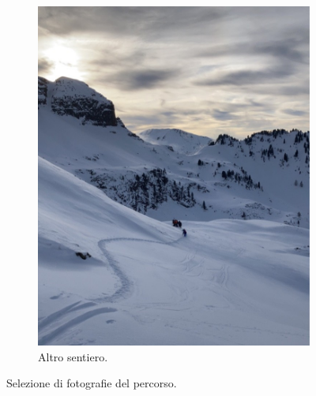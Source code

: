 \documentclass{article}
\begin{document}
\begin{figure}[H]
\begin{subfigure}[b]{0.45\textwidth}
        \includegraphics[width=\textwidth]{images/foto_sentiero2.JPG}
        \caption{Altro sentiero.}
    \end{subfigure}
    \hfill

    \caption{Selezione di fotografie del percorso.}
\end{figure}
\end{document}
